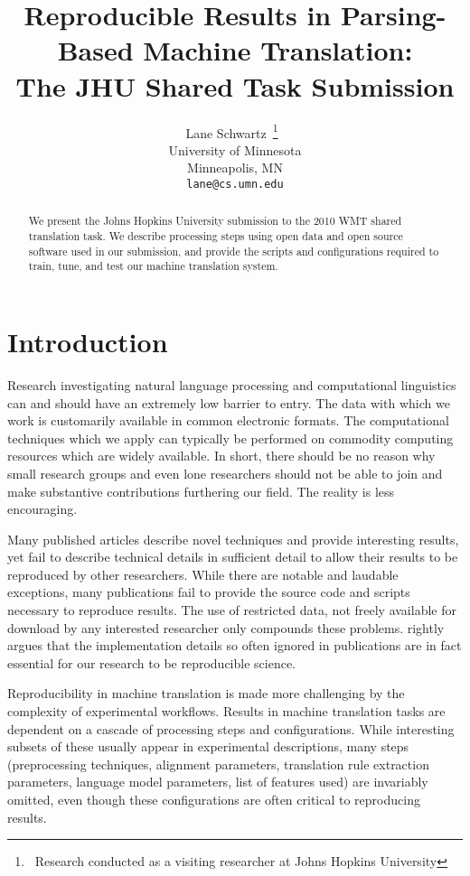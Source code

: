 \documentclass[11pt, a4paper]{article}
\title{Reproducible Results in Parsing-Based Machine Translation:\\
The JHU Shared Task Submission}
\author{Lane Schwartz\
\thanks{\ Research conducted as a visiting researcher at Johns Hopkins University}\
\\University of Minnesota\\Minneapolis, MN\\
{\tt lane@cs.umn.edu}%
}
\date{}
\begin{document}
\maketitle

\begin{abstract}
We present the Johns Hopkins University submission to the 2010 WMT shared translation task. We describe processing steps using open data and open source software used in our submission, and provide the scripts and configurations required to train, tune, and test our machine translation system.
\end{abstract}


\section{Introduction}

Research investigating natural language processing and computational linguistics can and should have an extremely low barrier to entry. The data with which we work is customarily available in common electronic formats. The computational techniques which we apply can typically be performed on commodity computing resources which are widely available. In short, there should be no reason why small research groups and even lone researchers should not be able to join and make substantive contributions furthering our field.
%
The reality is less encouraging. 

Many published articles describe novel techniques and provide interesting results, yet fail to describe technical details in sufficient detail to allow their results to be reproduced by other researchers. While there are notable and laudable exceptions, many publications fail to provide the source code and scripts necessary to reproduce results. The use of restricted data, not freely available for download by any interested researcher only compounds these problems.  rightly argues that the implementation details so often ignored in publications are in fact essential for our research to be reproducible science.

Reproducibility in machine translation is made more challenging by the complexity of experimental workflows. Results in machine translation tasks are dependent on a cascade of processing steps and configurations. While interesting subsets of these usually appear in experimental descriptions, many steps (preprocessing techniques, alignment parameters, translation rule extraction parameters, language model parameters, list of features used) are invariably omitted, even though these configurations are often critical to reproducing results.
\end{document}
